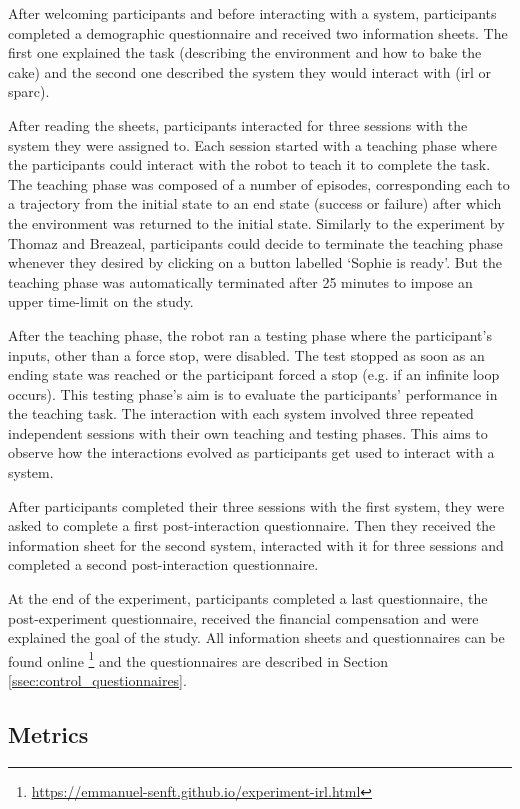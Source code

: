 After welcoming participants and before interacting with a system, participants completed a demographic questionnaire and received two information sheets. The first one explained the task (describing the environment and how to bake the cake) and the second one described the system they would interact with (\gls{irl} or \gls{sparc}). 

After reading the sheets, participants interacted for three sessions with the system they were assigned to. Each session started with a teaching phase where the participants could interact with the robot to teach it to complete the task. The teaching phase was composed of a number of episodes, corresponding each to a trajectory from the initial state to an end state (success or failure) after which the environment was returned to the initial state. Similarly to the experiment by Thomaz and Breazeal, participants could decide to terminate the teaching phase whenever they desired by clicking on a button labelled `Sophie is ready'. But the teaching phase was automatically terminated after 25 minutes to impose an upper time-limit on the study. 

After the teaching phase, the robot ran a testing phase where the participant's inputs, other than a force stop, were disabled. The test stopped as soon as an ending state was reached or the participant forced a stop (e.g. if an infinite loop occurs). This testing phase's aim is to evaluate the participants' performance in the teaching task. The interaction with each system involved three repeated independent sessions with their own teaching and testing phases. This aims to observe how the interactions evolved as participants get used to interact with a system.

After participants completed their three sessions with the first system, they were asked to complete a first post-interaction questionnaire. Then they received the information sheet for the second system, interacted with it for three sessions and completed a second post-interaction questionnaire.

At the end of the experiment, participants completed a last questionnaire, the post-experiment questionnaire, received the financial compensation and were explained the goal of the study. All information sheets and questionnaires can be found online \footnote{\url{https://emmanuel-senft.github.io/experiment-irl.html}} and the questionnaires are described in Section \ref{ssec:control_questionnaires}.

\subsection{Metrics}

